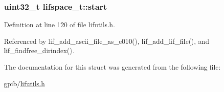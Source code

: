 \subsubsection[{\texorpdfstring{start}{start}}]{\setlength{\rightskip}{0pt plus 5cm}uint32\+\_\+t lifspace\+\_\+t\+::start}\hypertarget{structlifspace__t_a35702daf31460f978a09aef7a42c2671}{}\label{structlifspace__t_a35702daf31460f978a09aef7a42c2671}


Definition at line 120 of file lifutils.\+h.



Referenced by lif\+\_\+add\+\_\+ascii\+\_\+file\+\_\+as\+\_\+e010(), lif\+\_\+add\+\_\+lif\+\_\+file(), and lif\+\_\+findfree\+\_\+dirindex().



The documentation for this struct was generated from the following file\+:\begin{DoxyCompactItemize}
\item 
gpib/\hyperlink{lifutils_8h}{lifutils.\+h}\end{DoxyCompactItemize}
